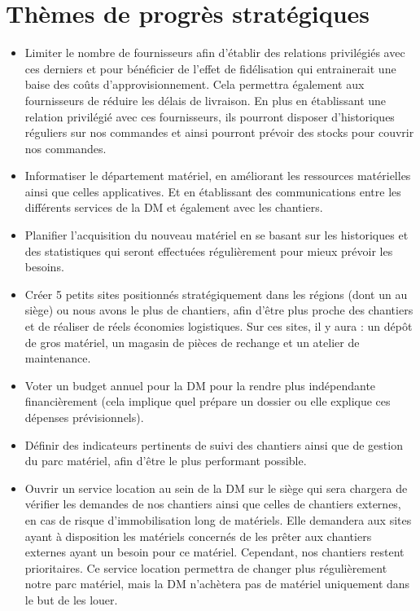 \section{Thèmes de progrès stratégiques}
        \begin{itemize}
                \item Limiter le nombre de fournisseurs afin d'établir des relations privilégiés avec ces derniers et pour bénéficier de l'effet de fidélisation qui entrainerait une baise des coûts d'approvisionnement. Cela permettra également aux fournisseurs de réduire les délais de livraison. En plus en établissant une relation privilégié avec ces fournisseurs, ils pourront disposer d'historiques réguliers sur nos commandes et ainsi pourront prévoir des stocks pour couvrir nos commandes.
                \item Informatiser le département matériel, en améliorant les ressources matérielles ainsi que celles applicatives. Et en établissant des communications entre les différents services de la DM et également avec les chantiers.
                \item Planifier l'acquisition du nouveau matériel en se basant sur les historiques et des statistiques qui seront effectuées régulièrement pour mieux prévoir les besoins.
                \item Créer 5 petits sites positionnés stratégiquement dans les régions (dont un au siège) ou nous avons le plus de chantiers, afin d'être plus proche des chantiers et de réaliser de réels économies logistiques. Sur ces sites, il y aura : un dépôt de gros matériel, un magasin de pièces de rechange et un atelier de maintenance.
                \item Voter un budget annuel pour la DM pour la rendre plus indépendante financièrement (cela implique quel prépare un dossier ou elle explique ces dépenses prévisionnels).
                \item Définir des indicateurs pertinents de suivi des chantiers ainsi que de gestion du parc matériel, afin d'être le plus performant possible.
                \item Ouvrir un service location au sein de la DM sur le siège qui sera chargera de vérifier les demandes de nos chantiers ainsi que celles de chantiers externes, en cas de risque d'immobilisation long de matériels. Elle demandera aux sites ayant à disposition les matériels concernés de les prêter aux chantiers externes ayant un besoin pour ce matériel. Cependant, nos chantiers restent prioritaires. Ce service location permettra de changer plus régulièrement notre parc matériel, mais la DM n'achètera pas de matériel uniquement dans le but de les louer.
        \end{itemize}

